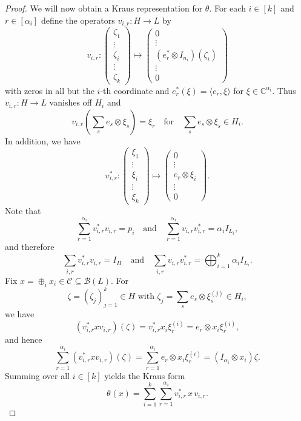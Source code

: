 \documentclass[10pt,a4paper]{amsart}
\def\al{\alpha}
\newcommand{\B}{{\mathcal{B}}}
\newcommand{\C}{{\mathcal{C}}}
\newcommand{\bC}{\mathbb{C}}
\newcommand{\qand}{\quad\text{and}\quad}
\begin{document}
\begin{proof}
We will now obtain a Kraus representation for $\theta$. For each $i\in [k]$ and $r\in[\al_i]$ define the operators $ v_{i,r}: H \to L$ by 
\[
v_{i,r}:\begin{pmatrix}
\zeta_1\\
\vdots\\
\zeta_i\\
\vdots\\
\zeta_k
\end{pmatrix} \mapsto \begin{pmatrix}
0 \\
\vdots \\
(e_r^* \otimes I_{n_i})(\zeta_i)\\
\vdots\\
0
\end{pmatrix}
\]
with zeros in all but the $i$-th coordinate and $e_r^*(\xi)=\langle e_r,\xi \rangle$ for $ \xi \in \bC^{\alpha_i}$.   Thus  $v_{i,r} \colon H\to L$ vanishes off $H_i$ and  
\[
v_{i,r}(\sum_s e_s\otimes\xi_s)=\xi_r \quad  \text{for} \quad \sum_s e_s\otimes\xi_s\in H_i.
\]
In addition, we have
\[
v_{i,r}^* : \begin{pmatrix}
\xi_1\\
\vdots\\
\xi_i\\
\vdots\\
\xi_k
\end{pmatrix} \mapsto \begin{pmatrix}
0 \\
\vdots\\
e_r \otimes \xi_i\\
\vdots\\
0
\end{pmatrix}.
\]
Note that
\[
\sum_{r=1}^{\alpha_i} v_{i,r}^*v_{i,r}=p_i
\qand
\sum_{r=1}^{\alpha_i} v_{i,r}v_{i,r}^*=\alpha_i I_{L_i},
\]
and therefore
\[
\sum_{i,r} v_{i,r}^*v_{i,r}=I_H
\qand
\sum_{i,r} v_{i,r}v_{i,r}^*=\bigoplus_{i=1}^k \alpha_i I_{L_i}.
\]
Fix $x=\oplus_i x_i\in\C\subseteq \B(L)$.
For 
\[
\zeta= (\zeta_j)_{j=1}^k\in H \text{ with }  \zeta_j=\sum_{s}e_s\otimes\xi_s^{(j)}\in H_i,
\]
we have
\[
(v_{i,r}^*xv_{i,r})(\zeta)= v_{i,r}^* 
x_i \xi_r^{(i)} = 
e_r \otimes x_i \xi_r^{(i)},
\]
and hence
\[
\sum_{r=1}^{\alpha_i} (v_{i,r}^*xv_{i,r})(\zeta)
=
\sum_{r=1}^{\alpha_i} e_r\otimes x_i\xi_r^{(i)}
=
(I_{\alpha_i}\otimes x_i)\zeta.
\]
Summing over all $i\in [k]$ yields the Kraus form
\[
\theta_{}(x)=\sum_{i=1}^k\sum_{r=1}^{\alpha_i} v_{i,r}^*\,x\,v_{i,r}.
\]


\end{proof}
\end{document}
